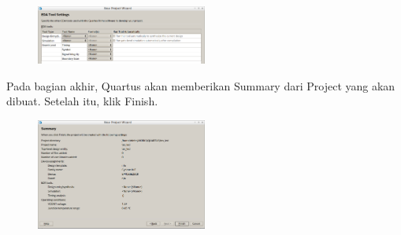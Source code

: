 \begin{figure}[H]
\centering
\includegraphics[width=0.5\textwidth]{images/NewProjectWizard_6.png}
\par
\end{figure}

Pada bagian akhir, Quartus akan memberikan Summary dari Project yang akan
dibuat. Setelah itu, klik {\sf Finish}.
\begin{figure}[H]
\centering
\includegraphics[width=0.5\textwidth]{images/NewProjectWizard_7.png}
\par
\end{figure}
